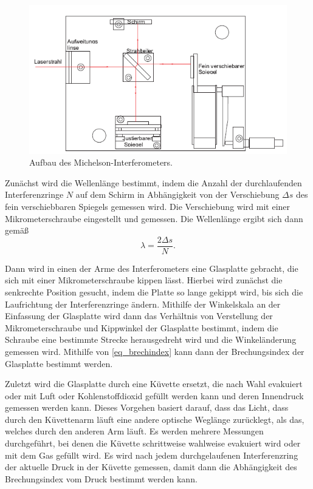 \documentclass[
	a4paper,
	12pt,
	pagesize,
	ngerman
]{scrartcl}
\begin{document}
	\begin{figure}[H]
		\includegraphics[width=\textwidth]{images/michelson_aufbau}
		\centering
		\caption{Aufbau des Michelson-Interferometers. \cite{Anleitung}}
		\label{fig_aufbau}
	\end{figure}

	Zunächst wird die Wellenlänge bestimmt, indem die Anzahl der durchlaufenden Interferenzringe $N$ auf dem Schirm in Abhängigkeit von der Verschiebung $\Delta s$ des fein verschiebbaren Spiegels gemessen wird.
	Die Verschiebung wird mit einer Mikrometerschraube eingestellt und gemessen.
	Die Wellenlänge ergibt sich dann gemäß
	\begin{equation}
		\lambda = \frac{2 \Delta s}{N}.
	\end{equation}

	Dann wird in einen der Arme des Interferometers eine Glasplatte gebracht, die sich mit einer Mikrometerschraube kippen lässt.
	Hierbei wird zunächst die senkrechte Position gesucht, indem die Platte so lange gekippt wird, bis sich die Laufrichtung der Interferenzringe ändern.
	Mithilfe der Winkelskala an der Einfassung der Glasplatte wird dann das Verhältnis von Verstellung der Mikrometerschraube und Kippwinkel der Glasplatte bestimmt, indem die Schraube eine bestimmte Strecke herausgedreht wird und die Winkeländerung gemessen wird.
	Mithilfe von \cref{eq_brechindex} kann dann der Brechungsindex der Glasplatte bestimmt werden.

	Zuletzt wird die Glasplatte durch eine Küvette ersetzt, die nach Wahl evakuiert oder mit Luft oder Kohlenstoffdioxid gefüllt werden kann und deren Innendruck gemessen werden kann.
	Dieses Vorgehen basiert darauf, dass das Licht, dass durch den Küvettenarm läuft eine andere optische Weglänge zurücklegt, als das, welches durch den anderen Arm läuft.
	Es werden mehrere Messungen durchgeführt, bei denen die Küvette schrittweise wahlweise evakuiert wird oder mit dem Gas gefüllt wird.
	Es wird nach jedem durchgelaufenen Interferenzring der aktuelle Druck in der Küvette gemessen, damit dann die Abhängigkeit des Brechungsindex vom Druck bestimmt werden kann.
\end{document}
